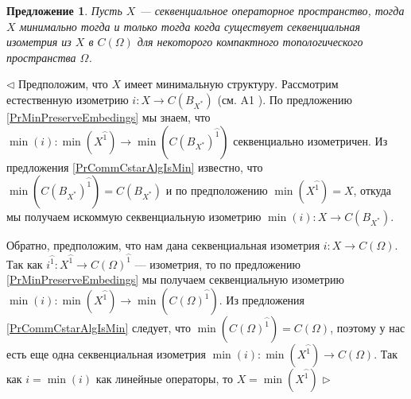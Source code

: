 \documentclass[12pt]{article}
\newtheorem{proposition}[theorem]{Предложение}
\newenvironment{proof}{\par $\triangleleft$}{$\triangleright$}
\begin{document}
\begin{proposition}\label{PrMinIsSubspOfCommCstarAlg} Пусть $X$ --- секвенциальное операторное пространство, тогда $X$ минимально тогда и только тогда когда существует секвенциальная изометрия из $X$ в $C(\Omega)$ для некоторого компактного топологического пространства $\Omega$.
\end{proposition}
\begin{proof} 
Предположим, что $X$ имеет минимальную структуру. Рассмотрим естественную изометрию $i:X\to C(B_{X^*})$ (см. A1 \cite{DefFloTensNorOpId}). По предложению \ref{PrMinPreserveEmbedings} мы знаем, что $\min(i):\min(X^{\wideparen{1}})\to\min(C(B_{X^*})^{\wideparen{1}})$ секвенциально изометричен. Из предложения \ref{PrCommCstarAlgIsMin} известно, что $\min(C(B_{X^*})^{\wideparen{1}})=C(B_{X^*})$ и по предположению $\min(X^{\wideparen{1}})=X$, откуда мы получаем искоммую секвенциальную изометрию $\min(i):X\to C(B_{X^*})$.

Обратно, предположим, что нам дана секвенциальная изометрия $i:X\to C(\Omega)$. Так как $i^{\wideparen{1}}:X^{\wideparen{1}}\to C(\Omega)^{\wideparen{1}}$ --- изометрия, то по предложению  \ref{PrMinPreserveEmbedings} мы получаем секвенциальную изометрию $\min(i):\min(X^{\wideparen{1}})\to\min(C(\Omega)^{\wideparen{1}})$. Из предложения \ref{PrCommCstarAlgIsMin} следует, что $\min(C(\Omega)^{\wideparen{1}})=C(\Omega)$, поэтому у нас есть еще одна секвенциальная изометрия $\min(i):\min(X^{\wideparen{1}})\to C(\Omega)$. Так как $i=\min(i)$ как линейные операторы, то $X=\min(X^{\wideparen{1}})$ 
\end{proof}
\end{document}
